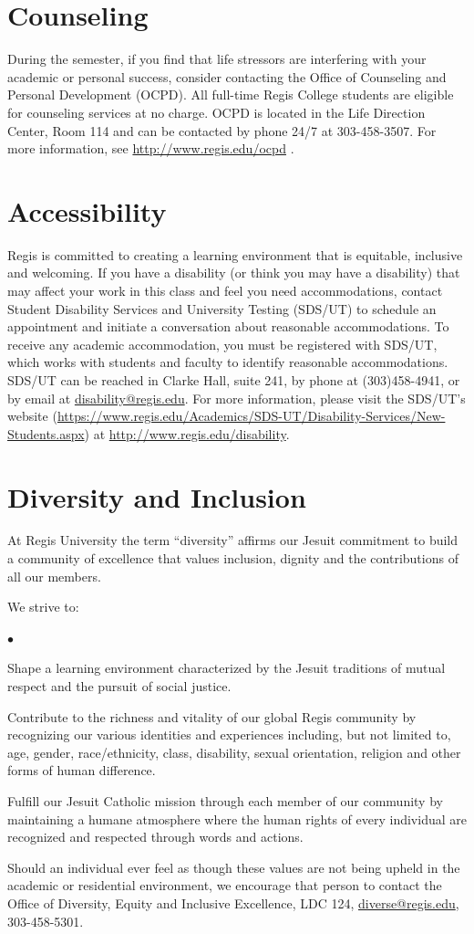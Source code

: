 \documentclass[11pt]{article}
\newcommand{\squishlist}{
   \begin{list}{$\bullet$}
    { \setlength{\itemsep}{0pt}      \setlength{\parsep}{3pt}
      \setlength{\topsep}{3pt}       \setlength{\partopsep}{0pt}
      \setlength{\leftmargin}{1.5em} \setlength{\labelwidth}{1em}
      \setlength{\labelsep}{0.5em} } }
\newcommand{\squishend}{
    \end{list}  }
\begin{document}
\section{Counseling}

During the semester, if you find that life stressors are interfering with your academic or personal success, consider contacting the Office of Counseling and Personal Development (OCPD). All full-time Regis College students are eligible for counseling services at no charge. OCPD is located in the Life Direction Center, Room 114 and can be contacted by phone 24/7 at 303-458-3507. For more information, see {\url{http://www.regis.edu/ocpd}} .

\section{Accessibility}

Regis is committed to creating a learning environment that is equitable, inclusive and welcoming. If you have a disability (or think you may have a disability) that may affect your work in this class and feel you need accommodations, contact Student Disability Services and University Testing (SDS/UT) to schedule an appointment and initiate a conversation about reasonable accommodations. To receive any academic accommodation, you must be registered with SDS/UT, which works with students and faculty to identify reasonable accommodations.  SDS/UT  can be reached in Clarke Hall, suite 241, by phone at (303)458-4941,  or by email at \url{disability@regis.edu}. For more information, please visit the SDS/UT's website (\url{https://www.regis.edu/Academics/SDS-UT/Disability-Services/New-Students.aspx}) 
at \url{http://www.regis.edu/disability}. 


\section{Diversity and Inclusion}
At Regis University the term ``diversity'' affirms our Jesuit commitment to build a community of excellence that values inclusion, dignity and the contributions of all our members. 

We strive to:
\squishlist
\item Shape a learning environment characterized by the Jesuit traditions of mutual respect and the pursuit of social justice.
\item Contribute to the richness and vitality of our global Regis community by recognizing our various identities and experiences including, but not limited to, age, gender, race/ethnicity, class, disability, sexual orientation, religion and other forms of human difference.
\item Fulfill our Jesuit Catholic mission through each member of our community by maintaining a humane atmosphere where the human rights of every individual are recognized and respected through words and actions.
\squishend
Should an individual ever feel as though these values are not being upheld in the academic or residential environment, we encourage that person to contact the Office of Diversity, Equity and Inclusive Excellence, LDC 124, \url{diverse@regis.edu}, 303-458-5301. 
\end{document}
